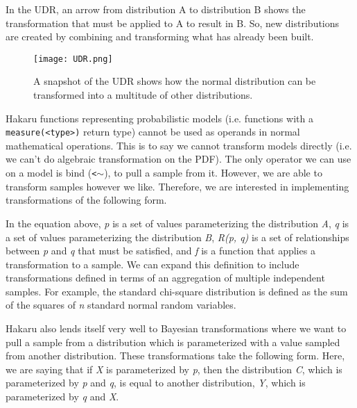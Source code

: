 \documentclass[11pt]{article}
\begin{document}
In the UDR, an arrow from distribution A to distribution B shows the transformation that must be applied to A to result in B. So, new distributions are created by combining and transforming what has already been built.

\begin{figure}
\centering
\texttt{[image: UDR.png]}
\caption{A snapshot of the UDR shows how the normal distribution can be transformed into a multitude of other distributions.}
\end{figure}

Hakaru functions representing probabilistic models (i.e. functions with a {\tt measure(<type>)} return type) cannot be used as operands in normal mathematical operations. This is to say we cannot transform models directly (i.e. we can’t do algebraic transformation on the PDF). The only operator we can use on a model is bind ({\tt \tiny{<$\sim$}}), to pull a sample from it. However, we are able to transform samples however we like. Therefore, we are interested in implementing transformations of the following form.

\begin{center}
\end{center}

In the equation above, \textit{p} is a set of values parameterizing the distribution \textit{A}, \textit{q} is a set of values parameterizing the distribution \textit{B}, \textit{R(p, q)} is a set of relationships between \textit{p} and \textit{q} that must be satisfied, and \textit{f} is a function that applies a transformation to a sample. We can expand this definition to include transformations defined in terms of an aggregation of multiple independent samples. For example, the standard chi-square distribution is defined as the sum of the squares of \textit{n} standard normal random variables.

Hakaru also lends itself very well to Bayesian transformations where we want to pull a sample from a distribution which is parameterized with a value sampled from another distribution. These transformations take the following form. Here, we are saying that if \textit{X} is parameterized by \textit{p}, then the distribution \textit{C}, which is parameterized by \textit{p} and \textit{q}, is equal to another distribution, \textit{Y}, which is parameterized by \textit{q} and \textit{X}.

\begin{center}
\end{center}
\end{document}
